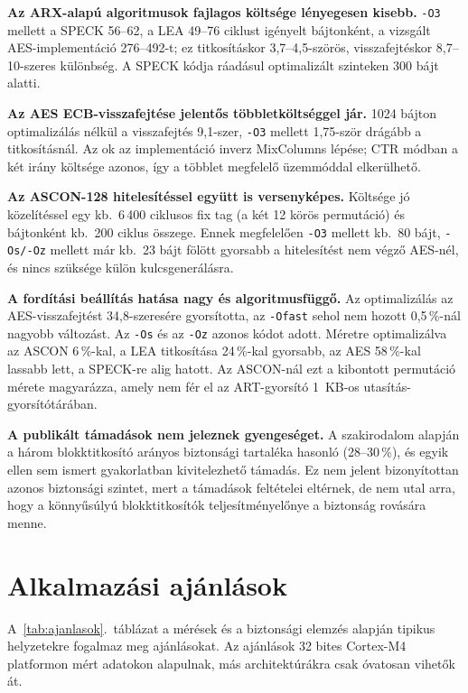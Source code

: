 \documentclass[a4paper,12pt]{report}
\theoremstyle{definition}
\theoremstyle{remark}
\begin{document}
\textbf{Az ARX-alapú algoritmusok fajlagos költsége lényegesen kisebb.} \texttt{-O3} mellett a SPECK 56--62, a LEA 49--76 ciklust igényelt bájtonként, a vizsgált AES-implementáció 276--492-t; ez titkosításkor 3,7--4,5-szörös, visszafejtéskor 8,7--10-szeres különbség. A SPECK kódja ráadásul optimalizált szinteken 300 bájt alatti.

\textbf{Az AES ECB-visszafejtése jelentős többletköltséggel jár.} 1024 bájton optimalizálás nélkül a visszafejtés 9,1-szer, \texttt{-O3} mellett 1,75-ször drágább a titkosításnál. Az ok az implementáció inverz MixColumns lépése; CTR módban a két irány költsége azonos, így a többlet megfelelő üzemmóddal elkerülhető.

\textbf{Az ASCON-128 hitelesítéssel együtt is versenyképes.} Költsége jó közelítéssel egy kb.\ 6\,400 ciklusos fix tag (a két 12 körös permutáció) és bájtonként kb.\ 200 ciklus összege. Ennek megfelelően \texttt{-O3} mellett kb.\ 80 bájt, \texttt{-Os/-Oz} mellett már kb.\ 23 bájt fölött gyorsabb a hitelesítést nem végző AES-nél, és nincs szüksége külön kulcsgenerálásra.

\textbf{A fordítási beállítás hatása nagy és algoritmusfüggő.} Az optimalizálás az AES-visszafejtést 34,8-szeresére gyorsította, az \texttt{-Ofast} sehol nem hozott 0,5\,\%-nál nagyobb változást. Az \texttt{-Os} és az \texttt{-Oz} azonos kódot adott. Méretre optimalizálva az ASCON 6\,\%-kal, a LEA titkosítása 24\,\%-kal gyorsabb, az AES 58\,\%-kal lassabb lett, a SPECK-re alig hatott. Az ASCON-nál ezt a kibontott permutáció mérete magyarázza, amely nem fér el az ART-gyorsító 1~KB-os utasítás-gyorsítótárában.

\textbf{A publikált támadások nem jeleznek gyengeséget.} A szakirodalom alapján a három blokktitkosító arányos biztonsági tartaléka hasonló (28--30\,\%), és egyik ellen sem ismert gyakorlatban kivitelezhető támadás. Ez nem jelent bizonyítottan azonos biztonsági szintet, mert a támadások feltételei eltérnek, de nem utal arra, hogy a könnyűsúlyú blokktitkosítók teljesítményelőnye a biztonság rovására menne.

\section{Alkalmazási ajánlások}

A~\ref{tab:ajanlasok}.~táblázat a mérések és a biztonsági elemzés alapján tipikus helyzetekre fogalmaz meg ajánlásokat. Az ajánlások 32 bites Cortex-M4 platformon mért adatokon alapulnak, más architektúrákra csak óvatosan vihetők át.
\end{document}
